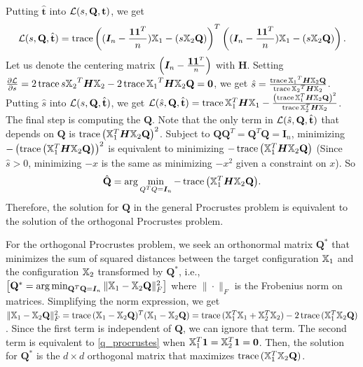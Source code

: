 \documentclass[12pt,oneside,final]{thesis}\usepackage[]{graphicx}\usepackage[]{color}
\begin{document}
Putting $\hat{\mathbf{t}}$ into  $\mathcal{L}(s,\mathbf{Q},{\mathbf{t}})$, we get 
\[\mathcal{L}(s,\mathbf{Q},\hat{\mathbf{t}}) = \operatorname{trace} \left((\bm{I}_n- \frac{\mbox{{\bf 1}} {\ensuremath{\mbox{{\bf 1}}}} ^T}{n}){\mathbb{X}}_1 - (s{\mathbb{X}}_2\mathbf{Q} )\right)^T \left((\bm{I}_n- \frac{\mbox{{\bf 1}} {\ensuremath{\mbox{{\bf 1}}}} ^T}{n}){\mathbb{X}}_1 - (s{\mathbb{X}}_2\mathbf{Q})\right).\]
Let us denote the centering matrix $\left(\bm{I}_n- \frac{\mbox{{\bf 1}} {\ensuremath{\mbox{{\bf 1}}}} ^T}{n}\right)$  with $\bm{H}$. 
Setting  $\frac{\partial \mathcal{L}}{\partial s}=2 \operatorname{trace} {s{{\mathbb{X}}_2}^T  \bm{H} {{\mathbb{X}}_2}}-2 \operatorname{trace} {  {{\mathbb{X}}_1}^T \bm{H} {\mathbb{X}}_2\mathbf{Q}}=\bm{0}$,
we get $\hat{s}=\frac{ \operatorname{trace} {  {{\mathbb{X}}_1}^T \bm{H} {\mathbb{X}}_2\mathbf{Q}}}{\operatorname{trace} {{{\mathbb{X}}_2}^T  \bm{H} {{\mathbb{X}}_2}}}$.
Putting $\hat{s}$ into $\mathcal{L}(s,\mathbf{Q},\hat{\mathbf{t}})$, we get
$\mathcal{L}(\hat{s},\mathbf{Q},\hat{\mathbf{t}}) = 
\operatorname{trace}{{\mathbb{X}}_1^T \bm{H} {\mathbb{X}}_1}- 
\frac{ \left({ \operatorname{trace}{  {\mathbb{X}}_1^T \bm{H} {\mathbb{X}}_2\mathbf{Q} }}\right)^2}
{\operatorname{trace}{{\mathbb{X}}_2^T \bm{H} {\mathbb{X}}_2}} $.
The final step is computing the $\mathbf{Q}$. 
Note that the only term in $\mathcal{L}(\hat{s},\mathbf{Q},\hat{\mathbf{t}})$  that depends on $\mathbf{Q}$ is  $\operatorname{trace} \left( {\mathbb{X}}_1^T \bm{H} {\mathbb{X}}_2\mathbf{Q}\right)^2$. 
Subject to $\mathbf{Q}\mathbf{Q}^T=\mathbf{Q}^T\mathbf{Q}=\bm{I}_n$, minimizing   $- \left( \operatorname{trace} \left( {\mathbb{X}}_1^T \bm{H} {\mathbb{X}}_2\mathbf{Q}\right)\right)^2$ is equivalent to minimizing  $-\operatorname{trace} \left( {\mathbb{X}}_1^T \bm{H} {\mathbb{X}}_2\mathbf{Q}\right)$ (Since $\hat{s}>0$, minimizing $-x$ is the same as minimizing $-x^2$ given a constraint on $x$). So  \[\hat{\mathbf{Q}}=\arg\min_{Q^TQ = \bm{I}_n}{-\operatorname{trace} \left( {\mathbb{X}}_1^T \bm{H} {\mathbb{X}}_2\mathbf{Q}\right)}. \label{q_procrustes}\] Therefore, the solution for $\mathbf{Q}$ in the general Procrustes problem is equivalent to the solution of the orthogonal Procrustes problem.

For the orthogonal Procrustes problem, we seek  an orthonormal matrix $\mathbf{Q}^*$ that minimizes the sum of squared distances between the  target configuration ${\mathbb{X}}_1$ and  the configuration ${\mathbb{X}}_2$ transformed by $\mathbf{Q}^*$, i.e.,
 $\left[\mathbf{Q}^* = \arg\min_{\mathbf{Q}^T\mathbf{Q} = \bm{I}_n} \|{\mathbb{X}}_1 - {\mathbb{X}}_2\mathbf{Q}\|_F^2  \right] $
 where $\|\cdot\|_F$ is the Frobenius norm on matrices.
Simplifying the norm expression, we get $\|{\mathbb{X}}_1 - {\mathbb{X}}_2\mathbf{Q}\|_F^2 = \operatorname{trace} {({\mathbb{X}}_1 - {\mathbb{X}}_2\mathbf{Q})^T({\mathbb{X}}_1 - {\mathbb{X}}_2\mathbf{Q})}= \operatorname{trace} {({\mathbb{X}}_1^T{\mathbb{X}}_1 + {\mathbb{X}}_2^T{\mathbb{X}}_2)} - 2\operatorname{trace}{ ({\mathbb{X}}_1^T {\mathbb{X}}_2\mathbf{Q})}$. Since the first term is independent of $\mathbf{Q}$, we can ignore that term. The second term  is equivalent to \eqref{q_procrustes} when  ${\mathbb{X}}_1^T\mbox{{\bf 1}} =  {\mathbb{X}}_2^T\mbox{{\bf 1}}=\bm{0}$. Then, the solution for $\mathbf{Q}^*$ is the  $d\times d$ orthogonal matrix that maximizes $\operatorname{trace}{ ({\mathbb{X}}_1^T {\mathbb{X}}_2\mathbf{Q})}$.
\end{document}
